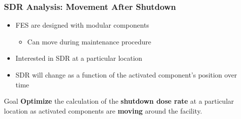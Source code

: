 \documentclass{beamer}
\begin{document}
%

\begin{frame}
\frametitle{SDR Analysis: Movement After Shutdown}
	\begin{itemize}
		\item{FES are designed with modular components}
	\begin{itemize}
		\item{Can move during maintenance procedure}
	\end{itemize}
		\item{Interested in SDR at a particular
					location}
		\item{SDR will change as a function of the
					activated component's position over
					time}
	\end{itemize}
	\begin{center}
	\end{center}
\end{frame}

\begin{frame}{Goal}
	\textbf{Optimize} the %
	calculation of the \textbf{shutdown dose rate}
	at a particular location as activated components are
	\textbf{moving} around the facility.
\end{frame}

\end{document}
